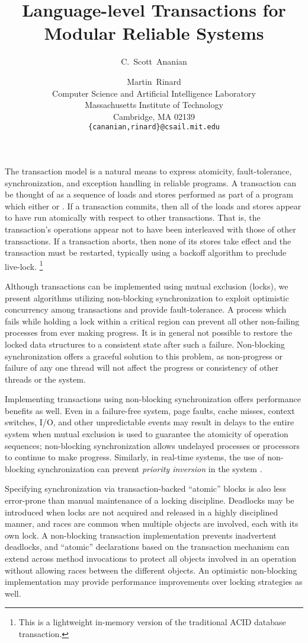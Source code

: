 \documentclass[twoside,twocolumn,notitlepage,letterpaper]{article}
\title{Language-level Transactions for Modular Reliable Systems}
\author{C.~Scott~Ananian \and Martin~Rinard \\
Computer Science and Artificial Intelligence Laboratory\\
Massachusetts Institute of Technology\\ 
Cambridge, MA 02139 \\
\texttt{\{cananian,rinard\}@csail.mit.edu}
}
\date{}
\begin{document}
\maketitle
{}

The transaction model is a natural means to express atomicity, 
fault-tolerance, synchronization, and exception handling in reliable
programs.  
A transaction can be thought of as a sequence of loads and stores
performed as part of a program which either
 or .  If a transaction
commits, then all of the loads and stores appear to have run
atomically with respect to other transactions.  That is, the
transaction's operations appear not to have been interleaved with
those of other transactions.  If a transaction aborts, then none of
its stores take effect and the transaction must be restarted,
typically using a backoff algorithm to preclude live-lock.%
\footnote{This is a lightweight in-memory version of the traditional
  ACID database transaction.}

Although transactions can be implemented using mutual exclusion
(locks), we present algorithms utilizing non-blocking synchronization to
exploit optimistic concurrency among transactions and provide fault-tolerance.
A process which fails while holding a lock within a
critical region can prevent all other non-failing processes from
ever making progress.
It is in general not possible to restore the
locked data structures to a consistent state after such a failure.
Non-blocking synchronization offers a graceful solution to this
problem, as non-progress or failure of any one thread will not
affect the progress or consistency of other threads or the system.

Implementing transactions using
non-blocking synchronization offers performance benefits as well.
Even in a failure-free system, page faults, cache misses, context
switches, I/O, and other unpredictable events may result in delays to the
entire system when mutual exclusion is used to guarantee the atomicity
of operation sequences; non-blocking
synchronization allows undelayed processes or processors to continue
to make progress.
Similarly, in real-time systems, the use of non-blocking
synchronization can prevent \emph{priority inversion} in the system
\cite{Jones97}.

Specifying synchronization via transaction-backed ``atomic'' blocks
is also less error-prone than manual maintenance of a locking
discipline.  Deadlocks may be introduced when locks are not acquired
and released in a highly disciplined manner, and races are common when
multiple objects are involved, each with its own lock.  A non-blocking
transaction implementation prevents inadvertent deadlocks, and
``atomic'' declarations based on the transaction mechanism can extend
across method invocations to protect all objects involved in an
operation without allowing races between the different objects.  An
optimistic non-blocking implementation may provide performance
improvements over locking strategies as well.
\end{document}
